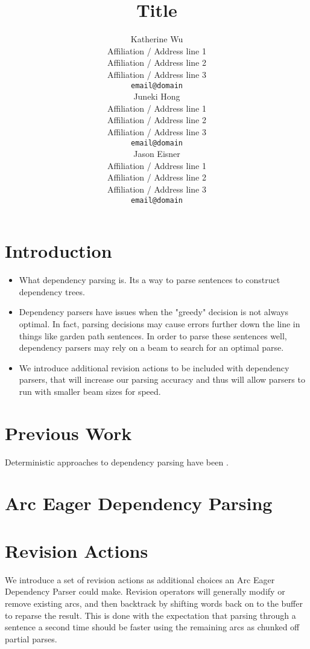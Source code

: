 \documentclass[11pt]{article}
\title{Title}
\author{Katherine Wu \\
  Affiliation / Address line 1 \\
  Affiliation / Address line 2 \\
  Affiliation / Address line 3 \\
  {\tt email@domain} \\\And
  Juneki Hong \\
  Affiliation / Address line 1 \\
  Affiliation / Address line 2 \\
  Affiliation / Address line 3 \\
  {\tt email@domain} \\\And
  Jason Eisner \\
  Affiliation / Address line 1 \\
  Affiliation / Address line 2 \\
  Affiliation / Address line 3 \\
  {\tt email@domain} \\
  }
\date{}
\begin{document}
\maketitle
\begin{abstract}

\end{abstract}





\section{Introduction}

\begin{itemize}
\item What dependency parsing is. Its a way to parse sentences to construct dependency trees.

\item Dependency parsers have issues when the "greedy" decision is not always optimal. In fact, parsing decisions may cause errors further down the line in things like garden path sentences. In order to parse these sentences well, dependency parsers may rely on a beam to search for an optimal parse. 

\item We introduce additional revision actions to be included with dependency parsers, that will increase our parsing accuracy and thus will allow parsers to run with smaller beam sizes for speed.


\end{itemize}



\section{Previous Work}

Deterministic approaches to dependency parsing have been \cite{Nivre03anefficient}.


\section{Arc Eager Dependency Parsing}



\section{Revision Actions}

We introduce a set of revision actions as additional choices an Arc Eager Dependency Parser could make. Revision operators will generally modify or remove existing arcs, and then backtrack by shifting words back on to the buffer to reparse the result. This is done with the expectation that parsing through a sentence a second time should be faster using the remaining arcs as chunked off partial parses. 
\end{document}
